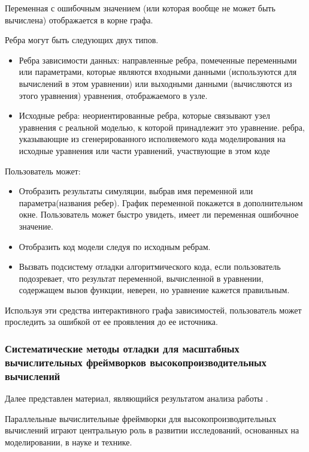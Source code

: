 Переменная с ошибочным значением (или которая вообще не может быть вычислена) отображается в корне графа.

Ребра могут быть следующих двух типов.
\begin{itemize}
	\item Ребра зависимости данных: направленные ребра, помеченные переменными или параметрами, которые являются входными данными (используются для вычислений в этом уравнении) или выходными данными (вычисляются из этого уравнения) уравнения, отображаемого в узле.
	\item Исходные ребра: неориентированные ребра, которые связывают узел уравнения с реальной моделью, к которой принадлежит это уравнение.
	ребра, указывающие из сгенерированного исполняемого кода моделирования на исходные уравнения или части уравнений, участвующие в этом коде 
\end{itemize}

Пользователь может:
\begin{itemize}
	\item Отобразить результаты симуляции, выбрав имя переменной или параметра(названия ребер). График переменной покажется в дополнительном окне. Пользователь может быстро увидеть, имеет ли переменная ошибочное значение.
	\item Отобразить код модели следуя по исходным ребрам.
	\item Вызвать подсистему отладки алгоритмического кода, если пользователь подозревает, что результат переменной, вычисленной в уравнении, содержащем вызов функции, неверен, но уравнение кажется правильным.
\end{itemize}

Используя эти средства интерактивного графа зависимостей, пользователь может проследить за ошибкой от ее проявления до ее источника.

\subsubsection{Систематические методы отладки для масштабных вычислительных фреймворков высокопроизводительных вычислений}

Далее представлен материал, являющийся результатом анализа работы \cite{Humphrey2014}.

Параллельные вычислительные фреймворки для высокопроизводительных вычислений играют центральную роль в развитии исследований, основанных на моделировании, в науке и технике.

